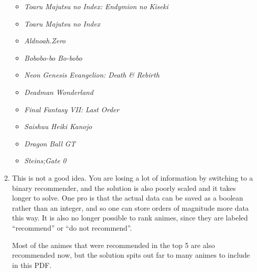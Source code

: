 \documentclass[11pt,a4paper]{article}
\begin{document}
\begin{enumerate}
\begin{itemize}
\item  \emph{       Toaru Majutsu no Index: Endymion no Kiseki          }
\item  \emph{       Toaru Majutsu no Index                              }
\item  \emph{       Aldnoah.Zero                               }         
\item  \emph{       Bobobo-bo Bo-bobo                           }        
\item  \emph{       Neon Genesis Evangelion: Death \& Rebirth    }    
\item  \emph{       Deadman Wonderland                            }      
\item  \emph{       Final Fantasy VII: Last Order                  }     
\item  \emph{       Saishuu Heiki Kanojo                            }    
\item  \emph{       Dragon Ball GT                                   }   
\item  \emph{       Steins;Gate 0   }
\end{itemize}

\item This is not a good idea. You are losing a lot of information by switching to a binary recommender, and the solution is also poorly scaled and it takes longer to solve.
One pro is that the actual data can be saved as a boolean rather than an integer, and so one can store orders of magnitude more data this way.
It is also no longer possible to rank animes, since they are labeled ``recommend'' or ``do not recommend''.

Most of the animes that were recommended in the top 5 are also recommended now, but the solution spits out far to many animes to include in this PDF.

\end{enumerate}
\end{document}
